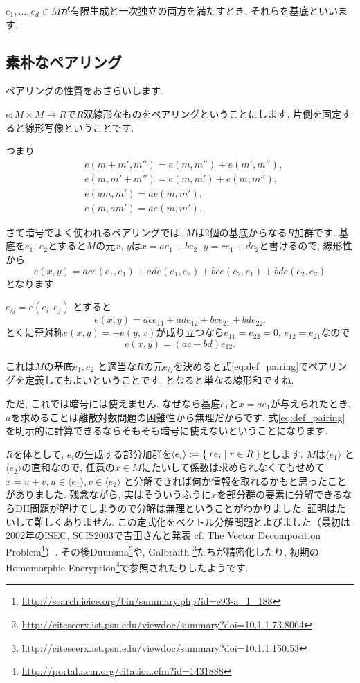 \documentclass{jsarticle}
\theoremstyle{definition}
\numberwithin{theorem}{section}
\begin{document}
$e_1, \ldots, e_d\in M$が有限生成と一次独立の両方を満たすとき, それらを基底といいます.

\subsection{素朴なペアリング}
ペアリングの性質をおさらいします.

$e: M\times M \rightarrow R$で$R$双線形なものをペアリングということにします.
片側を固定すると線形写像ということです.

つまり
\begin{align*}
& e(m+m', m'') = e(m, m'') + e(m', m''),\\
& e(m, m'+m'') = e(m, m') + e(m, m''),\\
& e(am, m') = ae(m, m'),\\
& e(m, am') = ae(m, m').
\end{align*}

さて暗号でよく使われるペアリングでは, $M$は2個の基底からなる$R$加群です. 基底を$e_1$, $e_2$とすると$M$の元$x$, $y$は$x = ae_1+be_2$,
$y = ce_1 + de_2$と書けるので, 線形性から
\[
e(x, y) = ac e(e_1, e_1) + ad e(e_1, e_2) + bc e(e_2, e_1) + bd e(e_2, e_2)
\]
となります.

$e_{ij} = e(e_i, e_j)$ とすると
\begin{equation}
\label{eq:def_pairing}
e(x, y) = ac e_{11} + ad e_{12} + bc e_{21} + bd e_{22}.
\end{equation}
とくに歪対称$e(x, y)=-e(y,x)$が成り立つなら$e_{11}=e_{22}=0$, $e_{12}=e_{21}$なので
\[
e(x,y)=(ac-bd)e_{12}.
\]

これは$M$の基底$e_1, e_2$ と適当な$R$の元$e_{ij}$を決めると式\ref{eq:def_pairing}でペアリングを定義してもよいということです.
となると単なる線形和ですね.

ただ, これでは暗号には使えません. なぜなら基底$e_1$と$x = ae_1$が与えられたとき, $a$を求めることは離散対数問題の困難性から無理だからです.
式\ref{eq:def_pairing}を明示的に計算できるならそもそも暗号に使えないということになります.

$R$を体として, $e_i$の生成する部分加群を$\langle e_i \rangle := \Set{re_i | r \in R}$とします. $M$は$\langle e_1\rangle$
と$\langle e_2\rangle$の直和なので, 任意の$x\in M$にたいして係数は求められなくてもせめて$x = u+v, u \in \langle e_1\rangle, v \in \langle e_2\rangle$
と分解できれば何か情報を取れるかもと思ったことがありました. 残念ながら, 実はそういうふうに$x$を部分群の要素に分解できるならDH問題が解けてしまうので分解は無理ということがわかりました.
証明はたいして難しくありません. この定式化をベクトル分解問題とよびました（最初は2002年のISEC, SCIS2003で吉田さんと発表 cf.
The Vector Decomposition Problem\footnote{\url{http://search.ieice.org/bin/summary.php?id=e93-a_1_188}}）.
その後Duursma\footnote{\url{http://citeseerx.ist.psu.edu/viewdoc/summary?doi=10.1.1.73.8064}}や, Galbraith
\footnote{\url{http://citeseerx.ist.psu.edu/viewdoc/summary?doi=10.1.1.150.53}}たちが精密化したり,
初期のHomomorphic Encryption\footnote{\url{http://portal.acm.org/citation.cfm?id=1431888}}で参照されたりしたようです.
\end{document}

